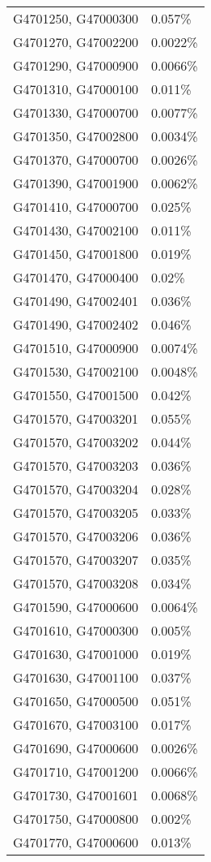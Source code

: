 \begin{longtable}[]{@{}ll@{}}
G4701250, G47000300 & 0.057\% \\
G4701270, G47002200 & 0.0022\% \\
G4701290, G47000900 & 0.0066\% \\
G4701310, G47000100 & 0.011\% \\
G4701330, G47000700 & 0.0077\% \\
G4701350, G47002800 & 0.0034\% \\
G4701370, G47000700 & 0.0026\% \\
G4701390, G47001900 & 0.0062\% \\
G4701410, G47000700 & 0.025\% \\
G4701430, G47002100 & 0.011\% \\
G4701450, G47001800 & 0.019\% \\
G4701470, G47000400 & 0.02\% \\
G4701490, G47002401 & 0.036\% \\
G4701490, G47002402 & 0.046\% \\
G4701510, G47000900 & 0.0074\% \\
G4701530, G47002100 & 0.0048\% \\
G4701550, G47001500 & 0.042\% \\
G4701570, G47003201 & 0.055\% \\
G4701570, G47003202 & 0.044\% \\
G4701570, G47003203 & 0.036\% \\
G4701570, G47003204 & 0.028\% \\
G4701570, G47003205 & 0.033\% \\
G4701570, G47003206 & 0.036\% \\
G4701570, G47003207 & 0.035\% \\
G4701570, G47003208 & 0.034\% \\
G4701590, G47000600 & 0.0064\% \\
G4701610, G47000300 & 0.005\% \\
G4701630, G47001000 & 0.019\% \\
G4701630, G47001100 & 0.037\% \\
G4701650, G47000500 & 0.051\% \\
G4701670, G47003100 & 0.017\% \\
G4701690, G47000600 & 0.0026\% \\
G4701710, G47001200 & 0.0066\% \\
G4701730, G47001601 & 0.0068\% \\
G4701750, G47000800 & 0.002\% \\
G4701770, G47000600 & 0.013\% \\

\end{longtable}
